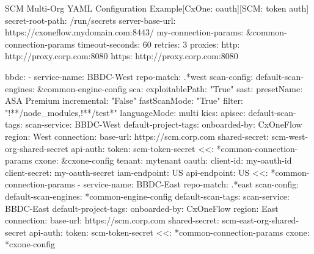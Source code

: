 \begin{code}{SCM Multi-Org YAML Configuration Example}{[CxOne: oauth]}{[SCM: token auth]}
secret-root-path: /run/secrets
server-base-url: https://cxoneflow.mydomain.com:8443/
my-connection-params: &common-connection-params
    timeout-seconds: 60
    retries: 3
    proxies:
    http: http://proxy.corp.com:8080
    https: http://proxy.corp.com:8080

bbdc:
    - service-name: BBDC-West
      repo-match: .*west
      scan-config: 
          default-scan-engines: &common-engine-config
              sca:
                  exploitablePath: "True"
              sast:
                  presetName: ASA Premium
                  incremental: "False"
                  fastScanMode: "True"
                  filter: "!**/node_modules,!**/test*"
                  languageMode: multi
              kics:
              apisec:
          default-scan-tags:
              scan-service: BBDC-West
          default-project-tags:
              onboarded-by: CxOneFlow
              region: West
      connection:
          base-url: https://scm.corp.com
          shared-secret: scm-west-org-shared-secret
          api-auth:
              token: scm-token-secret
          <<: *common-connection-params
      cxone: &cxone-config
          tenant: mytenant
          oauth:
              client-id: my-oauth-id
              client-secret: my-oauth-secret
          iam-endpoint: US
          api-endpoint: US
          <<: *common-connection-params
    - service-name: BBDC-East
      repo-match: .*east
      scan-config: 
          default-scan-engines: *common-engine-config
          default-scan-tags:
              scan-service: BBDC-East
          default-project-tags:
              onboarded-by: CxOneFlow
              region: East
      connection:
          base-url: https://scm.corp.com
          shared-secret: scm-east-org-shared-secret
          api-auth:
              token: scm-token-secret
          <<: *common-connection-params
      cxone: *cxone-config
\end{code}

